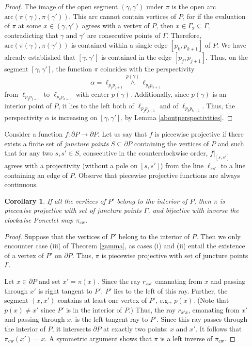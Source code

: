\documentclass[11pt]{amsart}
\newtheorem{corollary}[theorem]{Corollary}
\theoremstyle{remark}
\numberwithin{equation}{section}
\newcommand{\arc}{\mathrm{arc}}
\newcommand{\cw}{\mathrm{cw}}
\begin{document}
\begin{proof}
The image of the open segment $(\gamma,\gamma')$ under $\pi$ is the open arc $\arc(\pi(\gamma),\pi(\gamma'))$. This arc cannot contain vertices of $P$, for if the evaluation of $\pi$ at some $x\in (\gamma,\gamma')$ agrees with a vertex of $P$, then  $x\in\Gamma_2\subseteq \Gamma$, contradicting that $\gamma$ and $\gamma'$ are consecutive points of $\Gamma$. 
Therefore, $\arc(\pi(\gamma),\pi(\gamma'))$ is contained within a single edge $[p_k,p_{k+1}]$ of $P$. We have already established that $[\gamma,\gamma']$ is contained in the edge $[p_j,p_{j+1}]$. Thus, on the segment $[\gamma,\gamma']$, the function
$\pi$ coincides with the perspectivity 
\[
\alpha=\ell_{p_jp_{j+1}}\stackrel{p(\gamma)}{\wedge} \ell_{p_kp_{k+1}}
\] 
from $\ell_{p_jp_{j+1}}$ to $\ell_{p_kp_{k+1}}$ with center $p(\gamma)$.
 Additionally, since $p(\gamma)$ is an interior point of $P$, it lies to the left both of $\ell_{p_jp_{j+1}}$ and of $\ell_{p_kp_{k+1}}$.
 Thus, the perspectivity $\alpha$ is increasing  on $[\gamma,\gamma']$, by  Lemma \ref{aboutperspectivities}. 
\end{proof}

Consider  a function $f\colon \partial P\to \partial P$. Let us say that $f$ is piecewise projective if
there exists a finite set of \emph{juncture points} $S\subseteq \partial P$ containing the vertices of $P$ and such that for any two $s,s'\in S$, consecutive in the counterclockwise order, $f|_{[s,s']}$ agrees with a projectivity (without a pole on $[s,s']$) from the line $\ell_{ss'}$ to a line containing an edge of $P$. Observe that piecewise projective functions are always continuous.

\begin{corollary}\label{pwprojectivepi}
If all the vertices of $P'$ belong to the  interior of $P$, then  $\pi$ is piecewise projective with set of juncture points $\Gamma$,
and bijective with inverse the clockwise Poncelet map $\pi_{\cw}$.  
\end{corollary}

\begin{proof}
Suppose that the vertices of $P'$ belong to the interior of $P$.
Then we only encounter case (iii) of Theorem \ref{gamma}, as cases (i) and (ii) entail the existence of a vertex of $P'$ on $\partial P$. Thus, $\pi$ is piecewise projective with set of juncture points $\Gamma$. 

Let $x\in\partial P$ and set $x'=\pi(x)$. Since the ray  $r_{xx'}$
emanating from $x$ and passing through $x'$ is right tangent to $P'$, $P'$ lies to the left of this ray. Further, the segment $(x,x')$ contains at least one vertex of $P'$, e.g., $p(x)$. (Note that $p(x)\neq x'$ since $P'$ is in the interior of $P$.) Thus, the ray $r_{x'x}$, emanating from $x'$ and passing through $x$, is the left tangent ray to $P'$. Since this ray passes through the interior of $P$, it intersects $\partial P$ at exactly two points: $x$ and $x'$. It follows that $\pi_{\cw}(x')=x$. A symmetric argument shows that $\pi$ is a left inverse of $\pi_{\cw}$. 
\end{proof}
\end{document}
